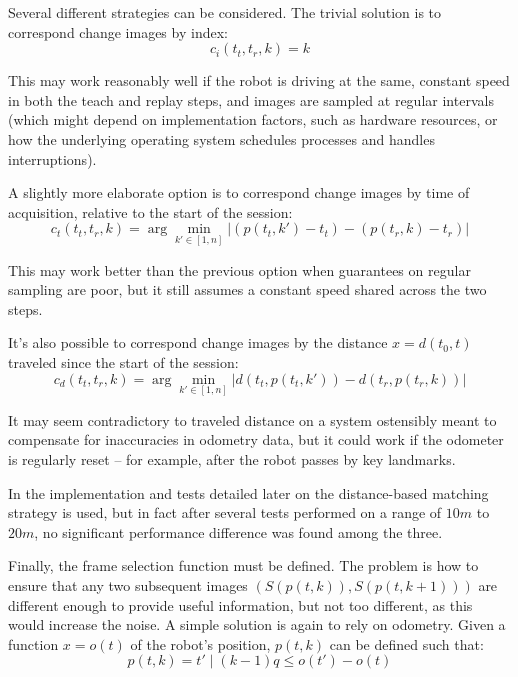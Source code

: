\documentclass[twocolumn, 9pt,fleqn]{jsproceedings}
\begin{document}
Several different strategies can be considered. The trivial solution is to correspond change images by index:
\begin{equation}
c_i(t_t, t_r, k) = k
\end{equation}

This may work reasonably well if the robot is driving at the same, constant speed in both the teach and replay steps, and images are sampled at regular intervals (which might depend on implementation factors, such as hardware resources, or how the underlying operating system schedules processes and handles interruptions).

A slightly more elaborate option is to correspond change images by time of acquisition, relative to the start of the session:
\begin{equation}
c_t(t_t, t_r, k) = \arg \min_{k' \in [1, n]} {| (p(t_t, k') - t_t) - (p(t_r, k) - t_r) |}
\end{equation}

This may work better than the previous option when guarantees on regular sampling are poor, but it still assumes a constant speed shared across the two steps.

It's also possible to correspond change images by the distance $x = d(t_0, t)$ traveled since the start of the session:
\begin{equation}
c_d(t_t, t_r, k) = \arg \min_{k' \in [1, n]} {| d(t_t, p(t_t, k')) - d(t_r, p(t_r, k)) |}
\end{equation}

It may seem contradictory to traveled distance on a system ostensibly meant to compensate for inaccuracies in odometry data, but it could work if the odometer is regularly reset -- for example, after the robot passes by key landmarks.

In the implementation and tests detailed later on the distance-based matching strategy is used, but in fact after several tests performed on a range of $10m$ to $20m$, no significant performance difference was found among the three.

Finally, the frame selection function must be defined. The problem is how to ensure that any two subsequent images $(S(p(t, k)), S(p(t, k+1)))$ are different enough to provide useful information, but not too different, as this would increase the noise. A simple solution is again to rely on odometry. Given a function $x = o(t)$ of the robot's position, $p(t, k)$ can be defined such that:
\begin{equation}
p(t, k) = t' \; | \; (k - 1)q \leq o(t') - o(t)
\end{equation}
\end{document}
